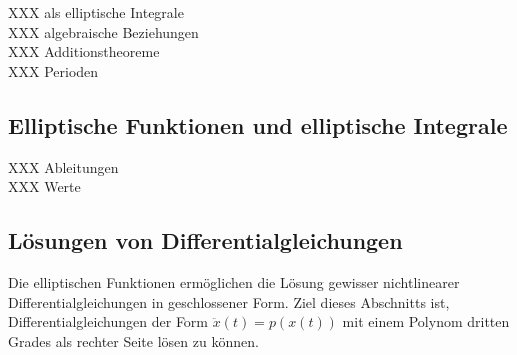 XXX als elliptische Integrale \\
XXX algebraische Beziehungen \\
XXX Additionstheoreme \\
XXX Perioden

\subsection{Elliptische Funktionen und elliptische Integrale}

XXX Ableitungen \\
XXX Werte \\

\subsection{Lösungen von Differentialgleichungen}
Die elliptischen Funktionen ermöglichen die Lösung gewisser nichtlinearer
Differentialgleichungen in geschlossener Form.
Ziel dieses Abschnitts ist, Differentialgleichungen der Form
\(
\ddot{x}(t)
=
p(x(t))
\)
mit einem Polynom dritten Grades als rechter Seite lösen zu können.

